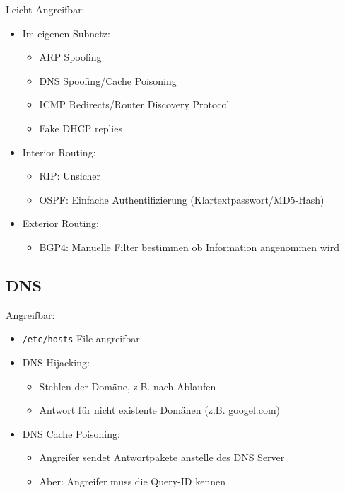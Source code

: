Leicht Angreifbar:
\begin{itemize}
    \item Im eigenen Subnetz:
        \begin{itemize}
            \item ARP Spoofing
            \item DNS Spoofing/Cache Poisoning
            \item ICMP Redirects/Router Discovery Protocol
            \item Fake DHCP replies
        \end{itemize}
    \item Interior Routing:
        \begin{itemize}
            \item RIP: Unsicher
            \item OSPF: Einfache Authentifizierung (Klartextpasswort/MD5-Hash)
        \end{itemize}
    \item Exterior Routing:
        \begin{itemize}
            \item BGP4: Manuelle Filter bestimmen ob Information angenommen wird
        \end{itemize}
\end{itemize}
    
\subsection{DNS}
Angreifbar:
\begin{itemize}
    \item \lstinline{/etc/hosts}-File angreifbar
    \item DNS-Hijacking:
        \begin{itemize}
            \item Stehlen der Domäne, z.B. nach Ablaufen
            \item Antwort für nicht existente Domänen (z.B. googel.com)
        \end{itemize}
    \item DNS Cache Poisoning:
        \begin{itemize}
            \item Angreifer sendet Antwortpakete anstelle des DNS Server
            \item Aber: Angreifer muss die Query-ID kennen
        \end{itemize} 
\end{itemize}

